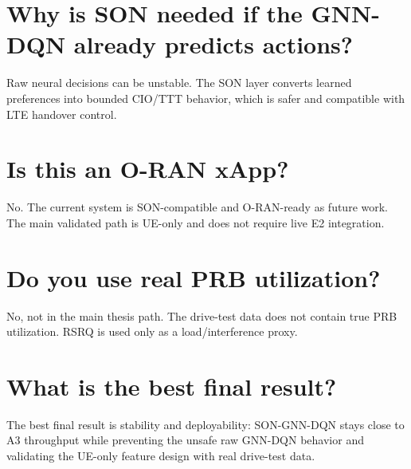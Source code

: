 \documentclass[12pt,a4paper]{report}
\begin{document}
\section*{Why is SON needed if the GNN-DQN already predicts actions?}
Raw neural decisions can be unstable. The SON layer converts learned preferences into bounded CIO/TTT behavior, which is safer and compatible with LTE handover control.

\section*{Is this an O-RAN xApp?}
No. The current system is SON-compatible and O-RAN-ready as future work. The main validated path is UE-only and does not require live E2 integration.

\section*{Do you use real PRB utilization?}
No, not in the main thesis path. The drive-test data does not contain true PRB utilization. RSRQ is used only as a load/interference proxy.

\section*{What is the best final result?}
The best final result is stability and deployability: SON-GNN-DQN stays close to A3 throughput while preventing the unsafe raw GNN-DQN behavior and validating the UE-only feature design with real drive-test data.
\end{document}
